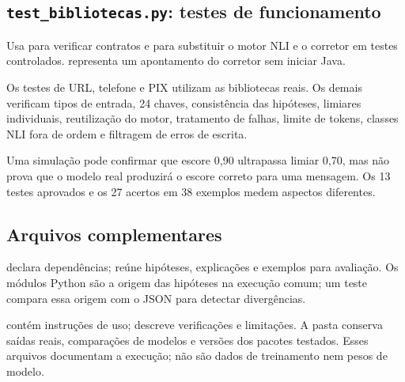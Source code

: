 \subsection{\texttt{test\_\allowbreak{}bibliotecas.py}: testes de funcionamento}
Usa  para verificar contratos e  para substituir o motor NLI e o corretor em testes controlados.  representa um apontamento do corretor sem iniciar Java.

Os testes de URL, telefone e PIX utilizam as bibliotecas reais. Os demais verificam tipos de entrada, 24 chaves, consistência das hipóteses, limiares individuais, reutilização do motor, tratamento de falhas, limite de tokens, classes NLI fora de ordem e filtragem de erros de escrita.

\begin{caixaatencao}
Uma simulação pode confirmar que escore 0,90 ultrapassa limiar 0,70, mas não prova que o modelo real produzirá o escore correto para uma mensagem. Os 13 testes aprovados e os 27 acertos em 38 exemplos medem aspectos diferentes.
\end{caixaatencao}

\subsection{Arquivos complementares}
 declara dependências;  reúne hipóteses, explicações e exemplos para avaliação. Os módulos Python são a origem das hipóteses na execução comum; um teste compara essa origem com o JSON para detectar divergências.

 contém instruções de uso;  descreve verificações e limitações. A pasta  conserva saídas reais, comparações de modelos e versões dos pacotes testados. Esses arquivos documentam a execução; não são dados de treinamento nem pesos de modelo.
